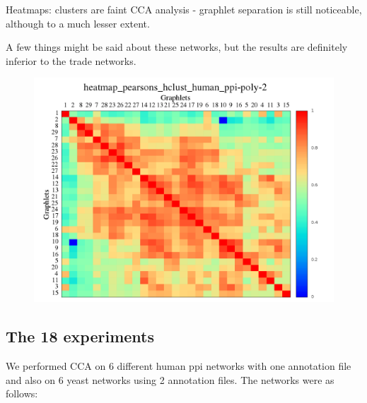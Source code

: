 \documentclass[11pt,a4paper,oneside]{report}
\begin{document}
Heatmaps: clusters are faint
CCA analysis - graphlet separation is still noticeable, although to a much lesser extent. 

A few things might be said about these networks, but the results are definitely inferior to the trade networks.

\begin{figure}[H]
  \centering
\includegraphics[scale=0.4]
{../code/final_results_norm1/human_ppi/heatmap_pearsons_hclust_human_ppi-poly-2.png}
\caption{}
\label{fig:human_ppi}
\end{figure}


\subsection*{The 18 experiments}

We performed CCA on 6 different human ppi networks with one annotation file and also on 6 yeast networks using 2 annotation files. The networks were as follows:
\end{document}
